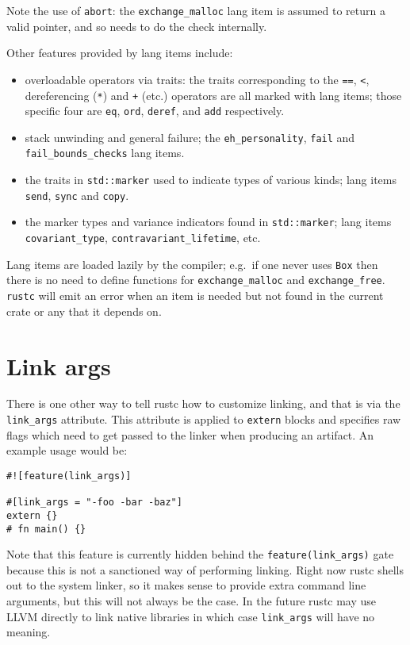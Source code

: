 \documentclass[a4paper,]{book}
\begin{document}
Note the use of \texttt{abort}: the \texttt{exchange\_malloc} lang item
is assumed to return a valid pointer, and so needs to do the check
internally.

Other features provided by lang items include:

\begin{itemize}
\itemsep1pt\parskip0pt
\item
  overloadable operators via traits: the traits corresponding to the
  \texttt{==}, \texttt{\textless{}}, dereferencing (\texttt{*}) and
  \texttt{+} (etc.) operators are all marked with lang items; those
  specific four are \texttt{eq}, \texttt{ord}, \texttt{deref}, and
  \texttt{add} respectively.
\item
  stack unwinding and general failure; the \texttt{eh\_personality},
  \texttt{fail} and \texttt{fail\_bounds\_checks} lang items.
\item
  the traits in \texttt{std::marker} used to indicate types of various
  kinds; lang items \texttt{send}, \texttt{sync} and \texttt{copy}.
\item
  the marker types and variance indicators found in
  \texttt{std::marker}; lang items \texttt{covariant\_type},
  \texttt{contravariant\_lifetime}, etc.
\end{itemize}

Lang items are loaded lazily by the compiler; e.g.~if one never uses
\texttt{Box} then there is no need to define functions for
\texttt{exchange\_malloc} and \texttt{exchange\_free}. \texttt{rustc}
will emit an error when an item is needed but not found in the current
crate or any that it depends on.

\section{Link args}\label{sec--link-args}

There is one other way to tell rustc how to customize linking, and that
is via the \texttt{link\_args} attribute. This attribute is applied to
\texttt{extern} blocks and specifies raw flags which need to get passed
to the linker when producing an artifact. An example usage would be:

\begin{verbatim}
#![feature(link_args)]

#[link_args = "-foo -bar -baz"]
extern {}
# fn main() {}
\end{verbatim}

Note that this feature is currently hidden behind the
\texttt{feature(link\_args)} gate because this is not a sanctioned way
of performing linking. Right now rustc shells out to the system linker,
so it makes sense to provide extra command line arguments, but this will
not always be the case. In the future rustc may use LLVM directly to
link native libraries in which case \texttt{link\_args} will have no
meaning.
\end{document}
